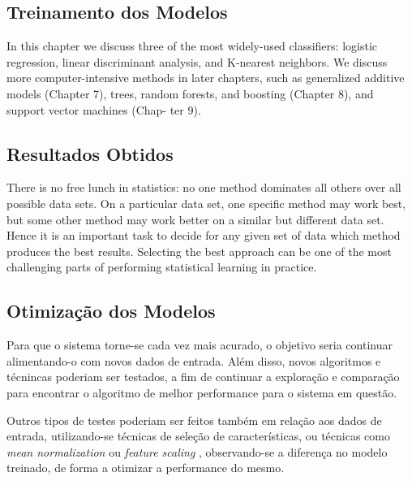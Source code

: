 		\subsection{Treinamento dos Modelos}

		In this chapter we discuss three of the most
widely-used classifiers: logistic regression, linear discriminant analysis, and
K-nearest neighbors. We discuss more computer-intensive methods in later
chapters, such as generalized additive models (Chapter 7), trees, random
forests, and boosting (Chapter 8), and support vector machines (Chap-
ter 9).




		\subsection{Resultados Obtidos}

		There
		is no free lunch in statistics: no one method dominates all others over all
		possible data sets. On a particular data set, one specific method may work
		best, but some other method may work better on a similar but different
		data set. Hence it is an important task to decide for any given set of data
		which method produces the best results. Selecting the best approach can
		be one of the most challenging parts of performing statistical learning in
		practice.



		\subsection{Otimização dos Modelos}

			Para que o sistema torne-se cada vez mais acurado, o objetivo seria continuar alimentando-o com novos dados de entrada. Além disso, novos algoritmos e técnincas poderiam ser testados, a fim de continuar a exploração e comparação para encontrar o algoritmo de melhor performance para o sistema em questão.

			Outros tipos de testes poderiam ser feitos também em relação aos dados de entrada, utilizando-se técnicas de seleção de características, ou técnicas como \emph{mean normalization} ou \emph{feature scaling} \cite{Coursera}, observando-se a diferença no modelo treinado, de forma a otimizar a performance do mesmo.



